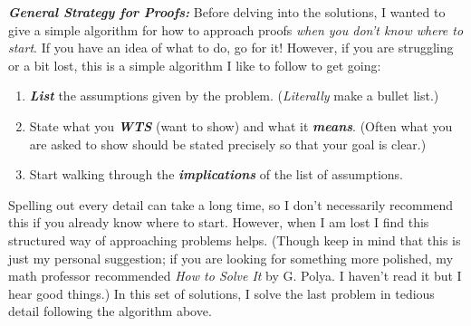 \documentclass{article}
\begin{document}
\displayoptions

\textbf{\textit{General Strategy for Proofs:}} Before delving into the solutions, I wanted to give a simple algorithm for how to approach proofs \textit{when you don't know where to start}. If you have an idea of what to do, go for it! However, if you are struggling or a bit lost, this  is a simple algorithm I like to follow to get going:
\begin{enumerate}
  \item \textbf{\textit{List}} the assumptions given by the problem. (\textit{Literally} make a bullet list.)

  \item State what you \textbf{\textit{WTS}} (want to show) and what it \textit{\textbf{means}}. (Often what you are asked to show should be stated precisely so that your goal is clear.)

  \item Start walking through the \textit{\textbf{implications}} of the list of assumptions.
\end{enumerate}

Spelling out every detail can take a long time, so I don't necessarily recommend this if you already know where to start. However, when I am lost I find this structured way of approaching problems helps. (Though keep in mind that  this is just my personal suggestion; if you are looking for something more polished, my math professor recommended \textit{How to Solve It} by G. Polya. I haven't read it but I hear good things.) In this set of solutions, I solve the last problem in tedious detail following the algorithm above.

\clearpage
\section{}
\end{document}
